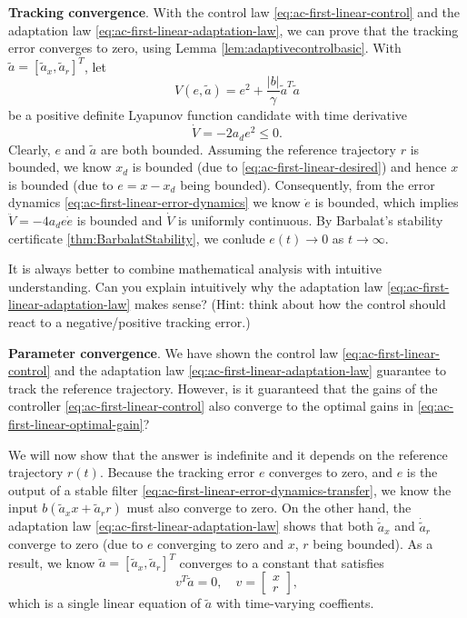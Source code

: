 \documentclass[
]{book}
\theoremstyle{definition}
\theoremstyle{definition}
\theoremstyle{definition}
\theoremstyle{definition}
\theoremstyle{remark}
\begin{document}
\textbf{Tracking convergence}. With the control law \eqref{eq:ac-first-linear-control} and the adaptation law \eqref{eq:ac-first-linear-adaptation-law}, we can prove that the tracking error converges to zero, using Lemma \ref{lem:adaptivecontrolbasic}. With \(\tilde{a}=[\tilde{a}_x, \tilde{a}_r]^T\), let
\begin{equation}
V(e,\tilde{a}) = e^2 + \frac{|b|}{\gamma} \tilde{a}^T \tilde{a}
\label{eq:ac-first-linear-lyapunov}
\end{equation}
be a positive definite Lyapunov function candidate with time derivative
\[
\dot{V} = - 2a_d e^2 \leq 0.
\]
Clearly, \(e\) and \(\tilde{a}\) are both bounded. Assuming the reference trajectory \(r\) is bounded, we know \(x_d\) is bounded (due to \eqref{eq:ac-first-linear-desired}) and hence \(x\) is bounded (due to \(e = x - x_d\) being bounded). Consequently, from the error dynamics \eqref{eq:ac-first-linear-error-dynamics} we know \(\dot{e}\) is bounded, which implies \(\ddot{V} = -4a_d e \dot{e}\) is bounded and \(\dot{V}\) is uniformly continuous. By Barbalat's stability certificate \ref{thm:BarbalatStability}, we conlude \(e(t) \rightarrow 0\) as \(t \rightarrow \infty\).

It is always better to combine mathematical analysis with intuitive understanding. Can you explain intuitively why the adaptation law \eqref{eq:ac-first-linear-adaptation-law} makes sense? (Hint: think about how the control should react to a negative/positive tracking error.)

\textbf{Parameter convergence}. We have shown the control law \eqref{eq:ac-first-linear-control} and the adaptation law \eqref{eq:ac-first-linear-adaptation-law} guarantee to track the reference trajectory. However, is it guaranteed that the gains of the controller \eqref{eq:ac-first-linear-control} also converge to the optimal gains in \eqref{eq:ac-first-linear-optimal-gain}?

We will now show that the answer is indefinite and it depends on the reference trajectory \(r(t)\). Because the tracking error \(e\) converges to zero, and \(e\) is the output of a stable filter \eqref{eq:ac-first-linear-error-dynamics-transfer}, we know the input \(b(\tilde{a}_x x + \tilde{a}_r r)\) must also converge to zero. On the other hand, the adaptation law \eqref{eq:ac-first-linear-adaptation-law} shows that both \(\dot{\tilde{a}}_x\) and \(\dot{\tilde{a}}_r\) converge to zero (due to \(e\) converging to zero and \(x\), \(r\) being bounded). As a result, we know \(\tilde{a} = [\tilde{a}_x,\tilde{a}_r]^T\) converges to a constant that satisfies
\begin{equation}
v^T \tilde{a} = 0, \quad v = \begin{bmatrix} x \\ r \end{bmatrix},
\label{eq:ac-first-linear-parameter-equation}
\end{equation}
which is a single linear equation of \(\tilde{a}\) with time-varying coeffients.
\end{document}
